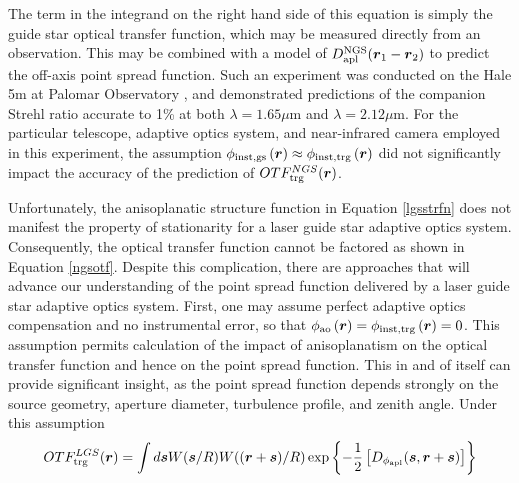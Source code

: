 The term in the integrand on the right hand side of this equation is
simply the guide star optical transfer function, which may be measured
directly from an observation.  This may be combined with a model of
$D^{\rm NGS}_{\rm apl}(\boldsymbol{r}_{1} - \boldsymbol{r}_{2})$ to
predict the off-axis point spread function.  Such an experiment was
conducted on the Hale 5m at Palomar Observatory
\cite{2006PASP..118..885B}, and demonstrated predictions of the
companion Strehl ratio accurate to 1\% at both $\lambda=1.65 \mu$m and
$\lambda=2.12 \mu$m.  For the particular telescope, adaptive optics
system, and near-infrared camera employed in this experiment, the
assumption $\phi_{\rm inst, gs}\left(\boldsymbol{r}\right) \approx
\phi_{\rm inst,trg}\left(\boldsymbol{r}\right)$ did not significantly
impact the accuracy of the prediction of $OTF^{NGS}_{\rm
  trg}(\boldsymbol{r})$.

Unfortunately, the anisoplanatic structure function in Equation
\ref{lgsstrfn} does not manifest the property of stationarity for a
laser guide star adaptive optics system.  Consequently, the optical
transfer function cannot be factored as shown in Equation
\ref{ngsotf}.  Despite this complication, there are approaches that
will advance our understanding of the point spread function delivered
by a laser guide star adaptive optics system.  First, one may assume
perfect adaptive optics compensation and no instrumental error, so
that $\phi_{\rm ao}\left(\boldsymbol{r}\right) = \phi_{\rm
  inst,trg}\left(\boldsymbol{r}\right) = 0$.  This assumption permits
calculation of the impact of anisoplanatism on the optical transfer
function and hence on the point spread function. This in and of itself
can provide significant insight, as the point spread function depends
strongly on the source geometry, aperture diameter, turbulence
profile, and zenith angle.  Under this assumption
\begin{equation}\label{lgsotfa}
\begin{aligned}
OTF^{LGS}_{\rm trg}(\boldsymbol{r}) = 
\int d\boldsymbol{s} W(\boldsymbol{s}/R)W((\boldsymbol{r}+\boldsymbol{s})/R) 
\exp{\left\{-{1 \over 2}\left[
D_{\rm \phi_{apl}}(\boldsymbol{s},\boldsymbol{r} + \boldsymbol{s})\right]\right\}}
\end{aligned}
\end{equation}

